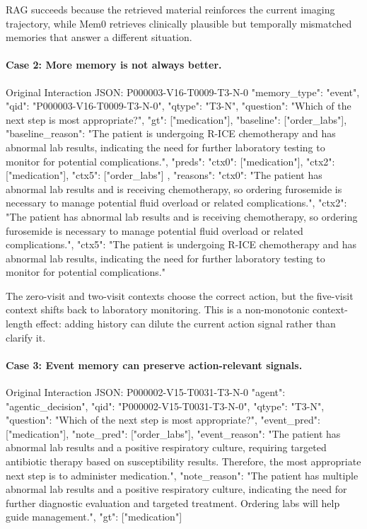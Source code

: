RAG succeeds because the retrieved material reinforces the current imaging trajectory, while Mem0 retrieves clinically plausible but temporally mismatched memories that answer a different situation.

\paragraph{Case 2: More memory is not always better.}
\begin{promptblock}{Original Interaction JSON: P000003-V16-T0009-T3-N-0}
{
  "memory_type": "event",
  "qid": "P000003-V16-T0009-T3-N-0",
  "qtype": "T3-N",
  "question": "Which of the next step is most appropriate?",
  "gt": ["medication"],
  "baseline": ["order_labs"],
  "baseline_reason": "The patient is undergoing R-ICE chemotherapy and has abnormal lab results, indicating the need for further laboratory testing to monitor for potential complications.",
  "preds": {
    "ctx0": ["medication"],
    "ctx2": ["medication"],
    "ctx5": ["order_labs"]
  },
  "reasons": {
    "ctx0": "The patient has abnormal lab results and is receiving chemotherapy, so ordering furosemide is necessary to manage potential fluid overload or related complications.",
    "ctx2": "The patient has abnormal lab results and is receiving chemotherapy, so ordering furosemide is necessary to manage potential fluid overload or related complications.",
    "ctx5": "The patient is undergoing R-ICE chemotherapy and has abnormal lab results, indicating the need for further laboratory testing to monitor for potential complications."
  }
}
\end{promptblock}

The zero-visit and two-visit contexts choose the correct action, but the five-visit context shifts back to laboratory monitoring. This is a non-monotonic context-length effect: adding history can dilute the current action signal rather than clarify it.

\paragraph{Case 3: Event memory can preserve action-relevant signals.}
\begin{promptblock}{Original Interaction JSON: P000002-V15-T0031-T3-N-0}
{
  "agent": "agentic_decision",
  "qid": "P000002-V15-T0031-T3-N-0",
  "qtype": "T3-N",
  "question": "Which of the next step is most appropriate?",
  "event_pred": ["medication"],
  "note_pred": ["order_labs"],
  "event_reason": "The patient has abnormal lab results and a positive respiratory culture, requiring targeted antibiotic therapy based on susceptibility results. Therefore, the most appropriate next step is to administer medication.",
  "note_reason": "The patient has multiple abnormal lab results and a positive respiratory culture, indicating the need for further diagnostic evaluation and targeted treatment. Ordering labs will help guide management.",
  "gt": ["medication"]
}
\end{promptblock}

